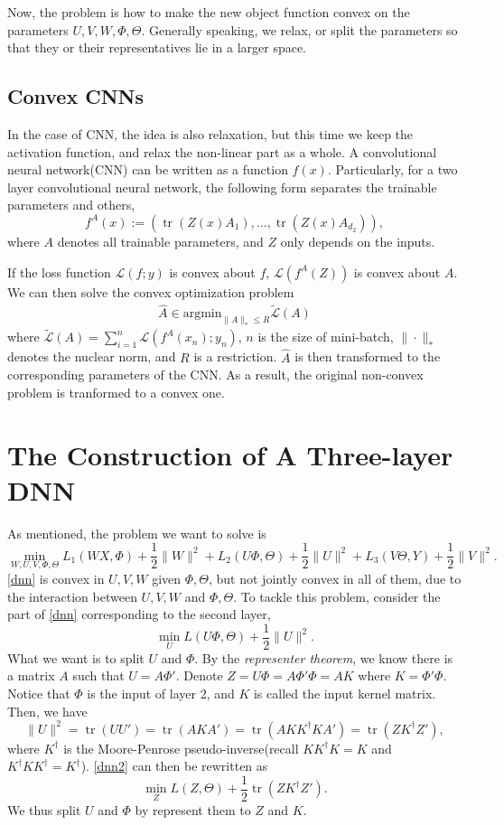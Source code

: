 \documentclass{article}
\DeclareMathOperator{\tr}{tr}
\begin{document}
Now, the problem is how to make the new object function convex on the parameters $U,V,W,\Phi,\Theta$. Generally speaking, we relax, or split the parameters so that they or their representatives lie in a larger space.

\subsection{Convex CNNs}
In the case of CNN, the idea is also relaxation, but this time we keep the activation function, and relax the non-linear part as a whole. A convolutional neural network(CNN) can be written as a function $f(x)$. Particularly, for a two layer convolutional neural network, the following form separates the trainable parameters and others,
\[f^A(x):=(\tr(Z(x)A_1),...,\tr(Z(x)A_{d_2})),\]
where $A$ denotes all trainable parameters, and $Z$ only depends on the inputs.

If the loss function $\mathcal{L}(f;y)$ is convex about $f$, $\mathcal{L}(f^A(Z))$ is convex about $A$. We can then solve the convex optimization problem
\begin{align*}
\widehat{A}\in\text{argmin}_{\|A\|_*\leq R}\tilde{\mathcal{L}}(A)
\end{align*}
where $\tilde{\mathcal{L}}(A)=\sum_{i=1}^n\mathcal{L}(f^A(x_n);y_n)$, $n$ is the size of mini-batch, $\|\cdot\|_*$ denotes the nuclear norm, and $R$ is a restriction. $\widehat{A}$ is then transformed to the corresponding parameters of the CNN. As a result, the original non-convex problem is tranformed to a convex one. 
\section{The Construction of A Three-layer DNN}
As mentioned, the problem we want to solve is 
\begin{equation}\label{dnn}
\min_{W,U,V,\Phi,\Theta}L_1(WX,\Phi)+\frac{1}{2}\|W\|^2+L_2(U\Phi,\Theta)+\frac{1}{2}\|U\|^2+L_3(V\Theta,Y)+\frac{1}{2}\|V\|^2.
\end{equation}
\eqref{dnn} is convex in $U,V,W$ given $\Phi,\Theta$, but not jointly convex in all of them, due to the interaction between $U,V,W$ and $\Phi,\Theta$. To tackle this problem, consider the part of \eqref{dnn} corresponding to the second layer,
\begin{equation}\label{dnn2}
	\min_U L(U\Phi,\Theta)+\frac{1}{2}\|U\|^2.
\end{equation}
What we want is to split $U$ and $\Phi$. By the \emph{representer theorem}, we know there is a matrix $A$ such that $U=A\Phi'$. Denote $Z=U\Phi=A\Phi'\Phi=AK$ where $K=\Phi'\Phi$. Notice that $\Phi$ is the input of layer 2, and $K$ is called the input kernel matrix. Then, we have 
\[\|U\|^2=\tr(UU')=\tr(AKA')=\tr(AKK^\dagger KA')=\tr(ZK^\dagger Z'),\]
where $K^\dagger$ is the Moore-Penrose pseudo-inverse(recall $KK^\dagger K=K$ and $K^\dagger KK^\dagger=K^\dagger$). \eqref{dnn2} can then be rewritten as
\begin{equation}\label{dnn3}
	\min_Z L(Z,\Theta)+\frac{1}{2}\tr(ZK^\dagger Z').
\end{equation}
We thus split $U$ and $\Phi$ by represent them to $Z$ and $K$.
\end{document}
